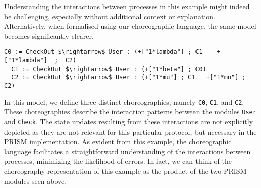 Understanding the interactions between processes in this example might
indeed be challenging, especially without additional context or
explanation.  Alternatively, when formalised using our choreographic
language, the same model becomes significantly clearer.
\begin{lstlisting}[style=chor-color,% caption={Example of Listing \ref{example1} in our choreographic language},captionpos=b,
  frame=none, label={example2}]
  C0 := CheckOut $\rightarrow$ User : (+["1*lambda"] ; C1	 +["1*lambda"]  ;  C2)
  C1 := CheckOut $\rightarrow$ User : (+["1*beta"] ; C0)  
  C2 := CheckOut $\rightarrow$ User : (+["1*mu"] ; C1   +["1*mu"] ;  C2)
\end{lstlisting}
In this model, we define three distinct choreographies, namely
\texttt{C0}, \texttt{C1}, and \texttt{C2}. These choreographies
describe the interaction patterns between the modules \texttt{User}
and \texttt{Check}. The state updates resulting from these
interactions are not explicitly depicted as they are not relevant for
this particular protocol, but necessary in the PRISM implementation.
%
%
As evident from this example, the choreographic language facilitates a
straightforward understanding of the interactions between processes,
minimizing the likelihood of errors. In fact, we can think of the
choreography representation of this example as the product of the two
PRISM modules seen above.



